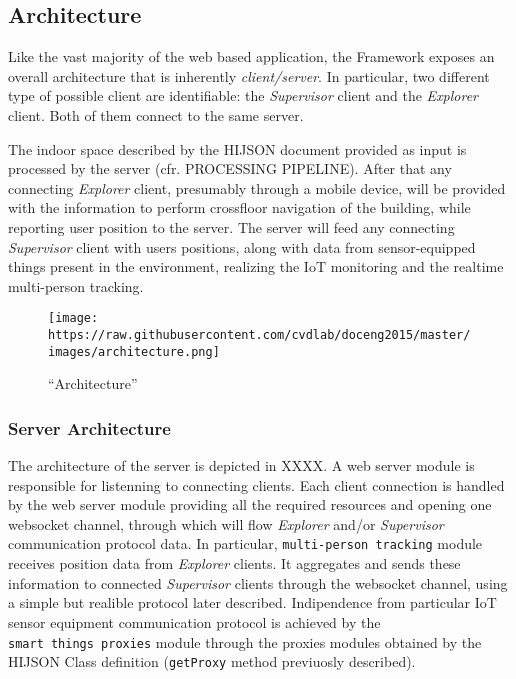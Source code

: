 \documentclass[]{article}
\begin{document}
\subsection{Architecture}\label{architecture}

Like the vast majority of the web based application, the Framework
exposes an overall architecture that is inherently \emph{client/server}.
In particular, two different type of possible client are identifiable:
the \emph{Supervisor} client and the \emph{Explorer} client. Both of
them connect to the same server.

The indoor space described by the HIJSON document provided as input is
processed by the server (cfr. PROCESSING PIPELINE). After that any
connecting \emph{Explorer} client, presumably through a mobile device,
will be provided with the information to perform crossfloor navigation
of the building, while reporting user position to the server. The server
will feed any connecting \emph{Supervisor} client with users positions,
along with data from sensor-equipped things present in the environment,
realizing the IoT monitoring and the realtime multi-person tracking.

\begin{figure}[htbp]
\centering
\texttt{[image: https://raw.githubusercontent.com/cvdlab/doceng2015/master/images/architecture.png]}
\caption{``Architecture''}
\end{figure}

\subsubsection{Server Architecture}\label{server-architecture}

The architecture of the server is depicted in XXXX. A web server module
is responsible for listenning to connecting clients. Each client
connection is handled by the web server module providing all the
required resources and opening one websocket channel, through which will
flow \emph{Explorer} and/or \emph{Supervisor} communication protocol
data. In particular, \texttt{multi-person\ tracking} module receives
position data from \emph{Explorer} clients. It aggregates and sends
these information to connected \emph{Supervisor} clients through the
websocket channel, using a simple but realible protocol later described.
Indipendence from particular IoT sensor equipment communication protocol
is achieved by the \texttt{smart\ things\ proxies} module through the
proxies modules obtained by the HIJSON Class definition
(\texttt{getProxy} method previuosly described).
\end{document}
